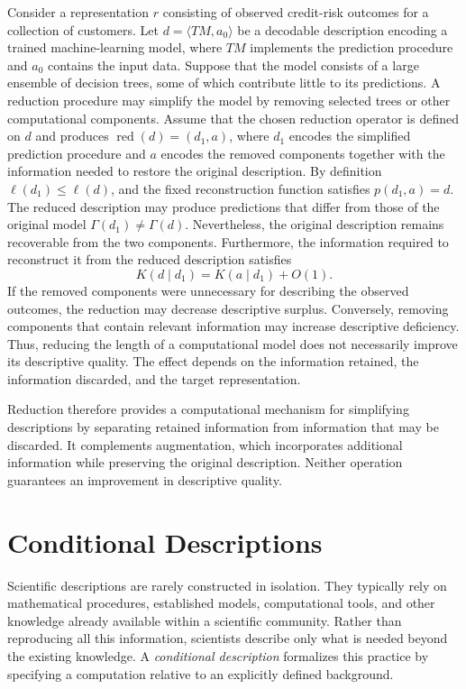 \begin{example}
Consider a representation $r$ consisting of observed credit-risk outcomes for a collection of customers. Let $d=\langle TM,a_0\rangle$ be a decodable description encoding a trained machine-learning model, where $TM$ implements the prediction procedure and $a_0$ contains the input data. Suppose that the model consists of a large ensemble of decision trees, some of which contribute little to its predictions. A reduction procedure may simplify the model by removing selected trees or other computational components. Assume that the chosen reduction operator is defined on $d$ and produces $\operatorname{red}(d)=(d_1,a)$, where $d_1$ encodes the simplified prediction procedure and $a$ encodes the removed components together with the information needed to restore the original description. By definition $\ell(d_1)\leq\ell(d)$, and the fixed reconstruction function satisfies $p(d_1,a)=d$. The reduced description may produce predictions that differ from those of the original model $\Gamma(d_1)\neq\Gamma(d)$. Nevertheless, the original description remains recoverable from the two components. Furthermore, the information required to reconstruct it from the reduced description satisfies
\[
K(d\mid d_1)=K(a\mid d_1)+O(1).
\]
If the removed components were unnecessary for describing the observed outcomes, the reduction may decrease descriptive surplus. Conversely, removing components that contain relevant information may increase descriptive deficiency. Thus, reducing the length of a computational model does not necessarily improve its descriptive quality. The effect depends on the information retained, the information discarded, and the target representation.
\end{example}

Reduction therefore provides a computational mechanism for simplifying descriptions by separating retained information from information that may be discarded. It complements augmentation, which incorporates additional information while preserving the original description. Neither operation guarantees an improvement in descriptive quality. 

%
%

\section{Conditional Descriptions}
\label{sec:conditional_descriptions}

Scientific descriptions are rarely constructed in isolation. They typically rely on mathematical procedures, established models, computational tools, and other knowledge already available within a scientific community. Rather than reproducing all this information, scientists describe only what is needed beyond the existing knowledge. A \emph{conditional description} formalizes this practice by specifying a computation relative to an explicitly defined background.

